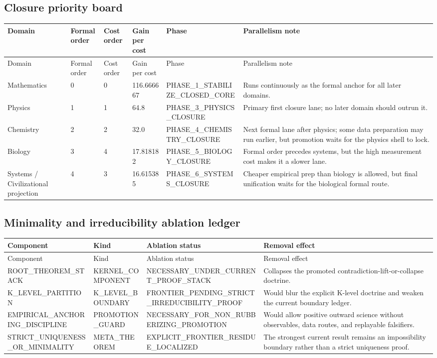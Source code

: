 \subsection{Closure priority board}
\begin{longtable}{p{}p{}p{}p{}p{}p{}}
\toprule
Domain & Formal order & Cost order & Gain per cost & Phase & Parallelism note \\
\midrule
\endfirsthead
\toprule
Domain & Formal order & Cost order & Gain per cost & Phase & Parallelism note \\
\midrule
\endhead
Mathematics & 0 & 0 & 116.666667 & PHASE\_1\_STABILIZE\_CLOSED\_CORE & Runs continuously as the formal anchor for all later domains. \\
Physics & 1 & 1 & 64.8 & PHASE\_3\_PHYSICS\_CLOSURE & Primary first closure lane; no later domain should outrun it. \\
Chemistry & 2 & 2 & 32.0 & PHASE\_4\_CHEMISTRY\_CLOSURE & Next formal lane after physics; some data preparation may run earlier, but promotion waits for the physics shell to lock. \\
Biology & 3 & 4 & 17.818182 & PHASE\_5\_BIOLOGY\_CLOSURE & Formal order precedes systems, but the high measurement cost makes it a slower lane. \\
Systems / Civilizational projection & 4 & 3 & 16.615385 & PHASE\_6\_SYSTEMS\_CLOSURE & Cheaper empirical prep than biology is allowed, but final unification waits for the biological formal route. \\
\bottomrule
\end{longtable}

\subsection{Minimality and irreducibility ablation ledger}
\begin{longtable}{p{}p{}p{}p{}}
\toprule
Component & Kind & Ablation status & Removal effect \\
\midrule
\endfirsthead
\toprule
Component & Kind & Ablation status & Removal effect \\
\midrule
\endhead
ROOT\_THEOREM\_STACK & KERNEL\_COMPONENT & NECESSARY\_UNDER\_CURRENT\_PROOF\_STACK & Collapses the promoted contradiction-lift-or-collapse doctrine. \\
K\_LEVEL\_PARTITION & K\_LEVEL\_BOUNDARY & FRONTIER\_PENDING\_STRICT\_IRREDUCIBILITY\_PROOF & Would blur the explicit K-level doctrine and weaken the current boundary ledger. \\
EMPIRICAL\_ANCHORING\_DISCIPLINE & PROMOTION\_GUARD & NECESSARY\_FOR\_NON\_RUBBERIZING\_PROMOTION & Would allow positive outward science without observables, data routes, and replayable falsifiers. \\
STRICT\_UNIQUENESS\_OR\_MINIMALITY & META\_THEOREM & EXPLICIT\_FRONTIER\_RESIDUE\_LOCALIZED & The strongest current result remains an impossibility boundary rather than a strict uniqueness proof. \\
\bottomrule
\end{longtable}

